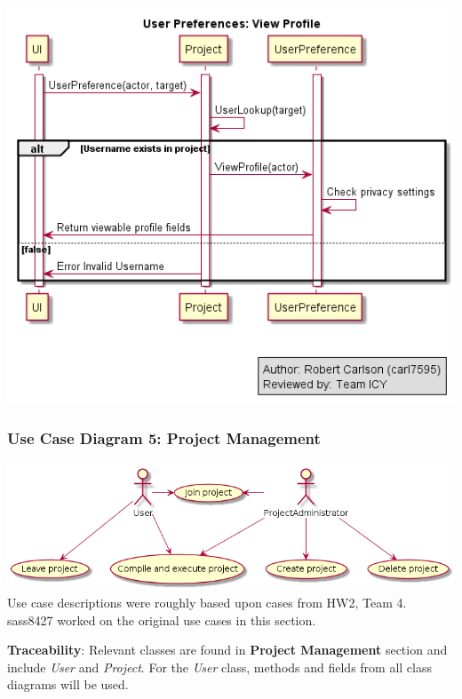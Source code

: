 \documentclass[twoside,letterpaper]{article}
\begin{document}
\includegraphics[width=\textwidth]{images/SequenceDiagrams/UserPreferencesViewProfile.png}

\newpage

\subsubsection[Use Case Diagram 5: Project Management (dani2918)]{\rmfamily\bfseries\color{black}
	Use Case Diagram 5: Project Management}

\bigskip
	
	\includegraphics[width=\textwidth]{images/UseCaseDiagrams/PMUCD} \vspace{5cm}
	\; \newline
	Use case descriptions were roughly based upon cases from HW2, Team 4. sass8427 worked on the original use cases in this section.\newline

\noindent \textbf{Traceability}:
Relevant classes are found in \textbf{Project Management} section and include \textit{User} and \textit{Project}. For the \textit{User} class, methods and fields from all class diagrams will be used.
\end{document}
